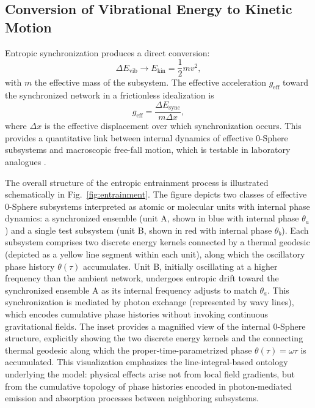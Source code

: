 \documentclass[%
 reprint,
 amsmath,amssymb,
 aps,
 prb,
]{revtex4-2}
\numberwithin{equation}{section}
\begin{document}
\subsection{Conversion of Vibrational Energy to Kinetic Motion}

Entropic synchronization produces a direct conversion:
\begin{equation}
\Delta E_\text{vib} \rightarrow E_\text{kin} = \frac{1}{2} m v^2,
\label{eq:energy_conversion}
\end{equation}
with $m$ the effective mass of the subsystem. The effective acceleration $g_\text{eff}$ toward the synchronized network in a frictionless idealization is
\begin{equation}
g_\text{eff} = \frac{\Delta E_\text{sync}}{m \Delta x},
\label{eq:effective_acceleration}
\end{equation}
where $\Delta x$ is the effective displacement over which synchronization occurs. This provides a quantitative link between internal dynamics of effective 0-Sphere subsystems and macroscopic free-fall motion, which is testable in laboratory analogues \cite{Leibfried2003,Bloch2008,Wineland1998}.

The overall structure of the entropic entrainment process is illustrated schematically in Fig.~\ref{fig:entrainment}. The figure depicts two classes of effective 0-Sphere subsystems interpreted as atomic or molecular units with internal phase dynamics: a synchronized ensemble (unit A, shown in blue with internal phase $\theta_a$) and a single test subsystem (unit B, shown in red with internal phase $\theta_b$). Each subsystem comprises two discrete energy kernels connected by a thermal geodesic (depicted as a yellow line segment within each unit), along which the oscillatory phase history $\theta(\tau)$ accumulates. Unit B, initially oscillating at a higher frequency than the ambient network, undergoes entropic drift toward the synchronized ensemble A as its internal frequency adjusts to match $\theta_a$. This synchronization is mediated by photon exchange (represented by wavy lines), which encodes cumulative phase histories without invoking continuous gravitational fields. The inset provides a magnified view of the internal 0-Sphere structure, explicitly showing the two discrete energy kernels and the connecting thermal geodesic along which the proper-time-parametrized phase $\theta(\tau) = \omega \tau$ is accumulated. This visualization emphasizes the line-integral-based ontology underlying the model: physical effects arise not from local field gradients, but from the cumulative topology of phase histories encoded in photon-mediated emission and absorption processes between neighboring subsystems.
\end{document}
